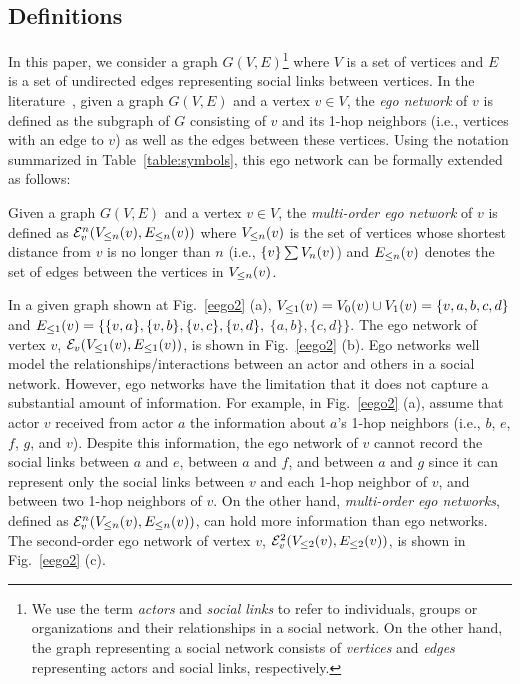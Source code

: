 \subsection{Definitions}\label{subsec:x-egoDefinition}
In this paper, we consider a graph $G(V, E)$\footnote{We use the term {\em actors} and {\em social links} to refer to individuals, groups or organizations and their relationships in a social network. On the other hand, the graph representing a social network consists of {\em vertices} and {\em edges} representing actors and social links, respectively.}
where $V$ is a set of vertices and $E$ is a set of undirected edges representing social links between vertices.
In the literature~\cite{egocentric, everett, ICCN:lbcdna, SIMBET}, given a graph $G(V, E)$ and a vertex $v \in V$, the {\em ego network} of $v$ is defined as the subgraph of $G$ consisting of $v$ and its 1-hop neighbors (i.e., vertices with an edge to $v$) as well as the edges between these vertices.
Using the notation summarized in Table~\ref{table:symbols}, this ego network can be formally extended as
follows:
\begin{definition}\label{def:multi-order-ego-network}
Given a graph $G(V, E)$ and a vertex $v \in V$, the \emph{multi-order ego network} of $v$ is defined as $\ENN{v}{n}
(\LV{v}{n}, \LE{v}{n})$ where $\LV{v}{n}$ is the set of vertices whose shortest distance from $v$ is no longer than $n$ (i.e., $\{ v \} \sum \V{v}{n}$) and $\LE{v}{n}$ denotes the set of edges between the vertices in $\LV{v}{n}$.
\end{definition}
In a given graph shown at Fig.~\ref{eego2} (a), $\LV{v}{1} = \V{v}{0} \cup \V{v}{1} = \{v, a, b, c, d\}$ and $\LE{v}{1}=\{ \{v, a\}, \{v, b\}, \{v, c\}, \{v, d\},$ $\{a, b\}, \{c, d\} \}$.
The ego network of vertex $v$, $\EN{v}(\LV{v}{1}, \LE{v}{1})$, is shown in Fig.~\ref{eego2} (b).
Ego networks well model the relationships/interactions between an actor and others in a social network.
However, ego networks have the limitation that it does not capture a substantial amount of information.
For example, in Fig.~\ref{eego2} (a), assume that actor $v$ received from actor $a$ the information about $a$'s 1-hop neighbors (i.e., $b$, $e$, $f$, $g$, and $v$).
Despite this information, the ego network of $v$ cannot record the social links between $a$ and $e$, between $a$ and $f$, and between $a$ and $g$ since it can represent only the social links between $v$ and each 1-hop neighbor of $v$, and between two 1-hop neighbors of $v$.
On the other hand, {\it multi-order ego networks}, defined as $\ENN{v}{n} (\LV{v}{n}, \LE{v}{n})$, can hold more
information than ego networks. The second-order ego network of vertex $v$, $\ENN{v}{2} (\LV{v}{2}, \LE{v}{2})$, is shown
in Fig.~\ref{eego2} (c).

